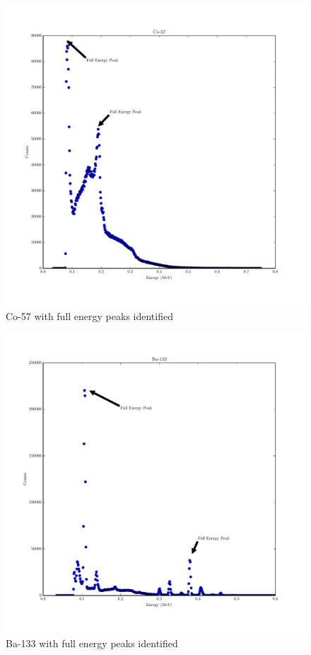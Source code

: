 \documentclass[reprint, nobibnotes, amssymb, amsmath, amsfonts, physics, mathtools, mathrsfs, floatfix]{revtex4-1}
\begin{document}
\begin{widetext}
        \begin{figure}[h]
          \centering
          \includegraphics[width=\linewidth]{../plots/Co-57.pdf}
          \caption{Co-57 with full energy peaks identified \label{fig:co}}
        \end{figure}

        \begin{figure}[h]
          \centering
          \includegraphics[width=\linewidth]{../plots/Ba-133.pdf}
          \caption{Ba-133 with full energy peaks identified \label{fig:ba}}
        \end{figure}


\end{widetext}
\end{document}
